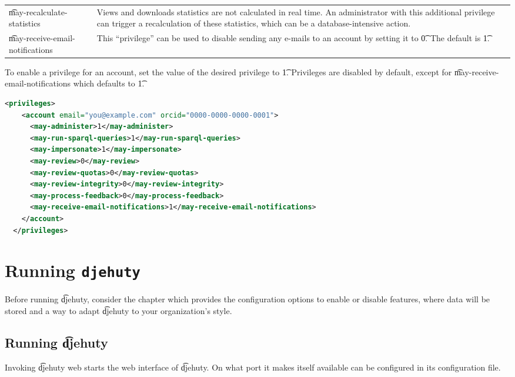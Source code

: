 \begin{tabularx}{\textwidth}{*{1}{!{\VRule[-1pt]}l}!{\VRule[-1pt]}X}
  \t{may-recalculate-statistics}      & Views and downloads statistics are not
                                        calculated in real time.  An administrator
                                        with this additional privilege can trigger
                                        a recalculation of these statistics, which
                                        can be a database-intensive action.\\
  \t{may-receive-email-notifications} & This ``privilege'' can be used to disable
                                        sending any e-mails to an account by
                                        setting it to \t{0}.  The default is
                                        \t{1}.
\end{tabularx}

  To enable a privilege for an account, set the value of the desired privilege
  to \t{1}.  Privileges are disabled by default, except for
  \t{may-receive-email-notifications} which defaults to \t{1}.

\begin{lstlisting}[language=xml]
  <privileges>
    <account email="you@example.com" orcid="0000-0000-0000-0001">
      <may-administer>1</may-administer>
      <may-run-sparql-queries>1</may-run-sparql-queries>
      <may-impersonate>1</may-impersonate>
      <may-review>0</may-review>
      <may-review-quotas>0</may-review-quotas>
      <may-review-integrity>0</may-review-integrity>
      <may-process-feedback>0</may-process-feedback>
      <may-receive-email-notifications>1</may-receive-email-notifications>
    </account>
  </privileges>
\end{lstlisting}

\chapter{Running \texttt{djehuty}}
\label{chap:running-djehuty}

  Before running \t{djehuty}, consider the chapter
   which provides the configuration options
  to enable or disable features, where data will be stored and a way to
  adapt \t{djehuty} to your organization's style.

\section{Running \t{djehuty}}

  Invoking \t{djehuty web} starts the web interface of \t{djehuty}.  On what
  port it makes itself available can be configured in its configuration file.

